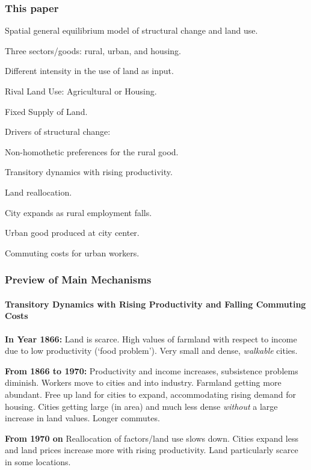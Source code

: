 \documentclass[aspectratio=169]{beamer}
\begin{document}
\begin{frame}
	\frametitle{This paper}
	\medskip	
	\hspace{-0.2cm}Spatial general equilibrium model of structural change and land use.
	\medskip
	\bi
	\item Three sectors/goods: rural, urban, and housing.
	\smallskip
	\bi
	\item Different intensity in the use of land as input.
	\smallskip
	\item Rival Land Use: Agricultural or Housing.	
	\smallskip
	\item Fixed Supply of Land.
	\ei
	\bigskip
	\item Drivers of structural change:
	\smallskip
	\bi 
	\item Non-homothetic preferences for the rural good.
	\smallskip
	\item Transitory dynamics with rising productivity.
	\ei

	\bigskip
	\item Land reallocation.
	\smallskip
	\bi
	\item City expands as rural employment falls.
	\smallskip
	\item Urban good produced at city center.
	\smallskip
	\item Commuting costs for urban workers.
	\ei
	\ei
\end{frame}



\begin{frame}
\frametitle{Preview of Main Mechanisms}
\framesubtitle{Transitory Dynamics with Rising Productivity and Falling Commuting Costs}

\begin{widei}
\item<1-> \textbf{In Year 1866:} Land is scarce. High values of farmland with respect to income due to low productivity (`food problem'). Very small and dense, \emph{walkable} cities.
\item<2-> \textbf{From 1866 to 1970:} Productivity and income increases, subsistence problems diminish. Workers move to cities and into industry. Farmland getting more abundant. Free up land for cities to expand, accommodating rising demand for housing. Cities getting large (in area) and much less dense \emph{without} a large increase in land values. Longer commutes.
\item<3-> \textbf{From 1970 on} Reallocation of factors/land use slows down. Cities expand less and land prices increase more with rising productivity. Land particularly scarce in some locations.
\end{widei}
\end{frame}
\end{document}
